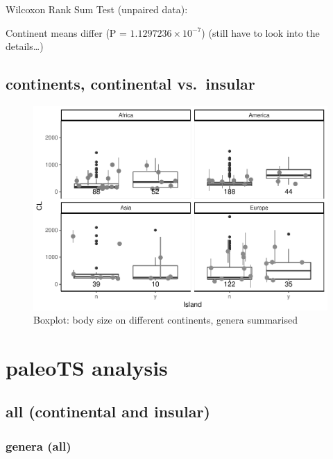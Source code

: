 \documentclass[]{article}
\begin{document}
Wilcoxon Rank Sum Test (unpaired data):

Continent means differ (P = \(1.1297236\times 10^{-7}\)) (still have to
look into the details\ldots{})

\newpage

\subsection{continents, continental
vs.~insular}\label{continents-continental-vs.insular}

\begin{figure}[htbp]
\centering
\includegraphics{MA_JJ_files/figure-latex/Boxplot body size split into continents, continental vs. insular-1.pdf}
\caption{Boxplot: body size on different continents, genera summarised}
\end{figure}

\newpage

\section{paleoTS analysis}\label{paleots-analysis}

\subsection{all (continental and
insular)}\label{all-continental-and-insular}

\subsubsection{genera (all)}\label{genera-all}
\end{document}
